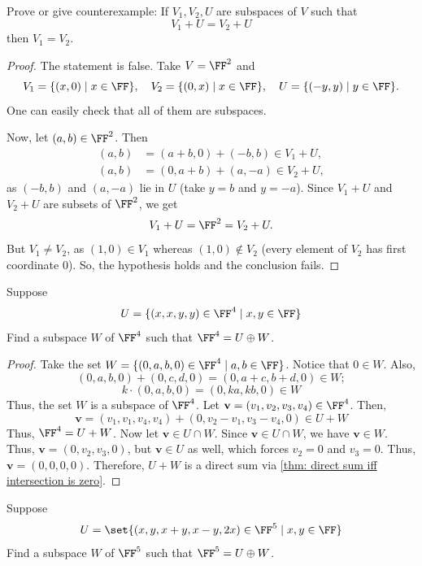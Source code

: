 \begin{exercise}
    \label{ex:1.18}
    Prove or give counterexample: If $V_1,V_2,U$ are subspaces of $V$ such that
    \[ V_1 + U = V_2 + U \]
    then $V_1=V_2$.
\end{exercise}
\begin{proof}
    The statement is false. Take $V=\FF^2$ and
    \[ V_1=\{(x,0) \mid x \in \FF\}, \quad V_2=\{(0,x) \mid x \in \FF\}, \quad U=\{(-y,y) \mid y \in \FF\}. \]
    One can easily check that all of them are subspaces.

    Now, let $(a,b) \in \FF^2$. Then
    \begin{align*}
        (a,b) &= (a+b,0) + (-b,b) \in V_1+U, \\
        (a,b) &= (0,a+b) + (a,-a) \in V_2+U,
    \end{align*}
    as $(-b,b)$ and $(a,-a)$ lie in $U$ (take $y=b$ and $y=-a$). Since $V_1+U$ and $V_2+U$ are subsets of $\FF^2$, we get
    \[ V_1+U=\FF^2=V_2+U. \]
    But $V_1 \neq V_2$, as $(1,0) \in V_1$ whereas $(1,0) \notin V_2$ (every element of $V_2$ has first coordinate $0$). So, the hypothesis holds and the conclusion fails.
\end{proof}

\begin{exercise}
    Suppose 
    \[ U = \{(x,x,y,y) \in \FF^4 \mid x,y \in \FF\} \]
    Find a subspace $W$ of $\FF^4$ such that $\FF^4 = U \oplus W$. 
\end{exercise}

\begin{proof}
    Take the set $W=\{(0,a,b,0) \in \FF^4 \mid a,b \in \FF\}$. Notice that $0 \in W$. Also, 
    \[ (0,a,b,0)+(0,c,d,0)=(0,a+c,b+d,0) \in W; \]
    \[ k \cdot (0,a,b,0) = (0,ka,kb,0) \in W \]
    Thus, the set $W$ is a subspace of $\FF^4$. 
    Let $\mathbf{v}=(v_1,v_2,v_3,v_4) \in \FF^4$. Then,
    \[ \mathbf{v}=(v_1,v_1,v_4,v_4)+(0,v_2-v_1,v_3-v_4,0) \in U+W \]
    Thus, $\FF^4= U+W$. 
    Now let $\mathbf{v} \in U \cap W$. Since $\mathbf{v} \in U \cap W$, we have $\mathbf{v} \in W$.
    Thus, \mbox{$\mathbf{v}=(0,v_2,v_3,0)$}, but $\mathbf{v} \in U$ as well, which forces $v_2=0$ and $v_3=0$. Thus, $\mathbf{v}=(0,0,0,0)$. Therefore, $U+W$ is a direct sum via \cref{thm: direct sum iff intersection is zero}.
\end{proof}

\begin{exercise}
    \label{ex:1.20}
    Suppose
    \[ U = \set{(x,y,x+y,x-y,2x) \in \FF^5 \mid x,y \in \FF} \]
    Find a subspace $W$ of $\FF^5$ such that $\FF^5 = U \oplus W$.
\end{exercise}

